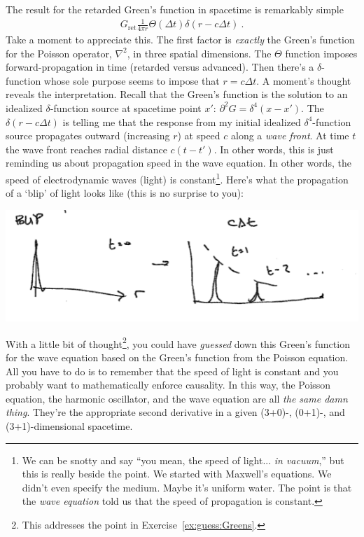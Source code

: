 The result for the retarded Green's function in spacetime is remarkably simple
\begin{align}
	G_\text{ret} \frac{1}{4\pi r} \Theta(\Delta t) \delta(r-c\Delta t) \ .
\end{align}
Take a moment to appreciate this. The first factor is \emph{exactly} the Green's function for the Poisson operator, $\nabla^2$, in three spatial dimensions. The $\Theta$ function imposes forward-propagation in time (retarded versus advanced). Then there's a $\delta$-function whose sole purpose seems to impose that $r = c\Delta t$. A moment's thought reveals the interpretation. Recall that the Green's function is the solution to an idealized $\delta$-function source at spacetime point $x'$: $\partial^2 G = \delta^4(x-x')$. The $\delta(r-c\Delta t)$ is telling me that the response from my initial idealized $\delta^4$-function source propagates outward (increasing $r$) at speed $c$ along a \emph{wave front}. At time $t$ the wave front reaches radial distance $c(t-t')$. In other words, this is just reminding us about propagation speed in the wave equation. In other words, the speed of electrodynamic waves (light) is constant\footnote{We can be snotty and say ``you mean, the speed of light... \emph{in vacuum},'' but this is really beside the point. We started with Maxwell's equations. We didn't even specify the medium. Maybe it's uniform water. The point is that the \emph{wave equation} told us that the speed of propagation is constant.}. Here's what the propagation of a `blip' of light looks like (this is no surprise to you):
\begin{center}
\includegraphics[width=.9\textwidth]{figures/Lec27_3dblip.png}
\end{center}

With a little bit of thought\footnote{This addresses the point in Exercise~\ref{ex:guess:Greens}.}, you could have \emph{guessed} down this Green's function for the wave equation based on the Green's function from the Poisson equation. All you have to do is to remember that the speed of light is constant and you probably want to mathematically enforce causality. In this way, the Poisson equation, the harmonic oscillator, and the wave equation are all \emph{the same damn thing}. They're the appropriate second derivative in a given (3+0)-, (0+1)-, and (3+1)-dimensional spacetime.


